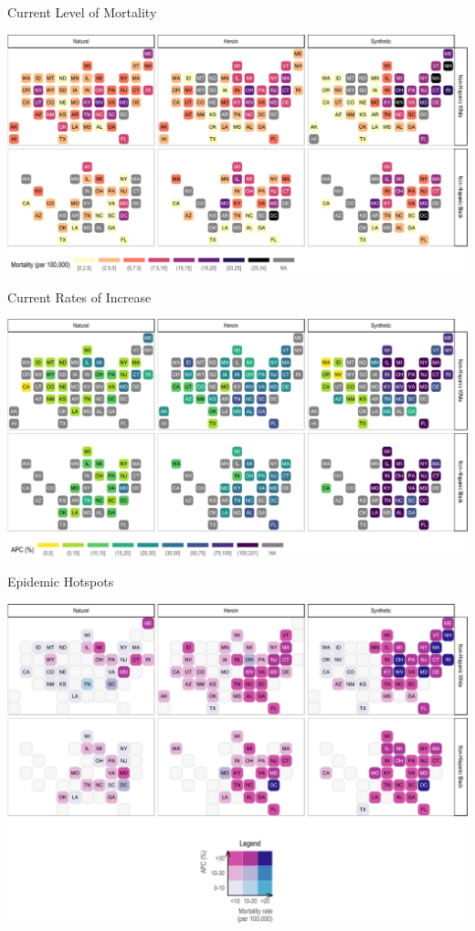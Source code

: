 \documentclass[ignorenonframetext,compress]{beamer}
\begin{document}
\begin{frame}{Current Level of Mortality}

\includegraphics{epc_slides_files/figure-beamer/unnamed-chunk-8-1.pdf}

\end{frame}

\begin{frame}{Current Rates of Increase}

\includegraphics{epc_slides_files/figure-beamer/unnamed-chunk-9-1.pdf}

\end{frame}

\begin{frame}{Epidemic Hotspots}

\begin{center}\includegraphics{epc_slides_files/figure-beamer/unnamed-chunk-10-1} \end{center}

\end{frame}
\end{document}
